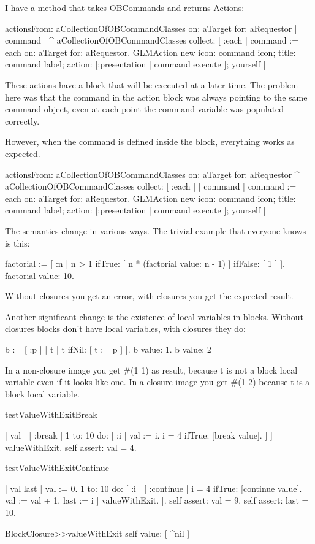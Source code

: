 \documentclass[a4paper,10pt,twoside]{book}
\begin{document}
I have a method that takes OBCommands and returns Actions:

\begin{code}{}
actionsFrom: aCollectionOfOBCommandClasses on: aTarget for: aRequestor
	| command |
	^ aCollectionOfOBCommandClasses collect: [ :each |
		command := each on: aTarget for: aRequestor.
		GLMAction new
			icon: command icon;
			title: command label;
			action: [:presentation | command execute ];
			yourself
		]
	\end{code}

These actions have a block that will be executed at a later time. The  
problem here was that the command in the action block was always  
pointing to the same command object, even at each point the command  
variable was populated correctly.

However, when the command is defined inside the block, everything  
works as expected.

\begin{code}{}
actionsFrom: aCollectionOfOBCommandClasses on: aTarget for: aRequestor
	^ aCollectionOfOBCommandClasses collect: [ :each |
		| command |
		command := each on: aTarget for: aRequestor.
		GLMAction new
			icon: command icon;
			title: command label;
			action: [:presentation | command execute ];
			yourself
		]
	\end{code}




The semantics change in various ways. The trivial example that everyone 
knows is this:
\begin{code}{}
factorial := [ :n |
	n > 1
		ifTrue: [ n * (factorial value: n - 1) ]
		ifFalse: [ 1 ] ].
factorial value: 10.
\end{code}
Without closures you get an error, with closures you get the expected 
result.

Another significant change is the existence of local variables in blocks. 
Without closures blocks don't have local variables, with closures they do:

\begin{code}{}
b := [ :p |
	| t |
	t ifNil: [ t := p ] ].
{ b value: 1. b value: 2 }
\end{code}

In a non-closure image you get \#(1 1) as result, because t is not a block 
local variable even if it looks like one. In a closure image you get \#(1 2)
because t is a block local variable.


\begin{code}{}
testValueWithExitBreak

	| val |	
	[ :break |
	    1 to: 10 do: [ :i |
			val := i.
			i = 4 ifTrue: [break value].
		] 
	] valueWithExit.
	self assert: val = 4.



testValueWithExitContinue

	| val last |	
	val := 0. 
	1 to: 10 do: [ :i |
		[ :continue |
			i = 4 ifTrue: [continue value].
			val := val + 1.
			last := i
		] valueWithExit.
	].
	self assert: val = 9.
	self assert: last = 10.	

BlockClosure>>valueWithExit 
	  self value: [ ^nil ]
\end{code}
\end{document}
